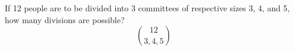 \item If 12 people are to be divided into 3 committees of respective sizes 3, 4, and 5, how many divisions are possible?
\[ \binom{12}{3,4,5} \]